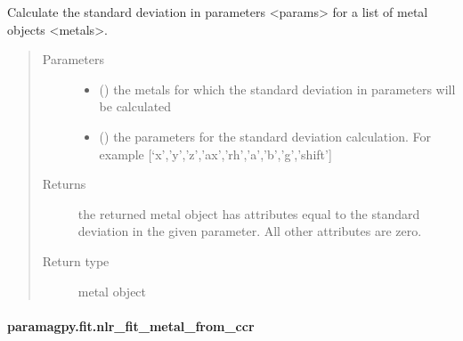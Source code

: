\documentclass[a4paper,10pt,english,openany,oneside]{sphinxmanual}
\begin{document}
\begin{fulllineitems}
\label{\detokenize{reference/generated/paramagpy.fit.metal_standard_deviation:paramagpy.fit.metal_standard_deviation}}
\sphinxAtStartPar
Calculate the standard deviation in parameters \textless{}params\textgreater{} for a
list of metal objects \textless{}metals\textgreater{}.
\begin{quote}\begin{description}
\item[{Parameters}] \leavevmode\begin{itemize}
\item {} 
\sphinxAtStartPar
{} () \textendash{} the metals for which the standard deviation in parameters
will be calculated

\item {} 
\sphinxAtStartPar
{} () \textendash{} the parameters for the standard deviation calculation.
For example {[}‘x’,’y’,’z’,’ax’,’rh’,’a’,’b’,’g’,’shift’{]}

\end{itemize}

\item[{Returns}] \leavevmode
\sphinxAtStartPar
{} \textendash{} the returned metal object has attributes equal to the
standard deviation in the given parameter.
All other attributes are zero.

\item[{Return type}] \leavevmode
\sphinxAtStartPar
metal object

\end{description}\end{quote}

\end{fulllineitems}



\paragraph{paramagpy.fit.nlr\_fit\_metal\_from\_ccr}
\label{\detokenize{reference/generated/paramagpy.fit.nlr_fit_metal_from_ccr:paramagpy-fit-nlr-fit-metal-from-ccr}}\label{\detokenize{reference/generated/paramagpy.fit.nlr_fit_metal_from_ccr::doc}}
\end{document}
